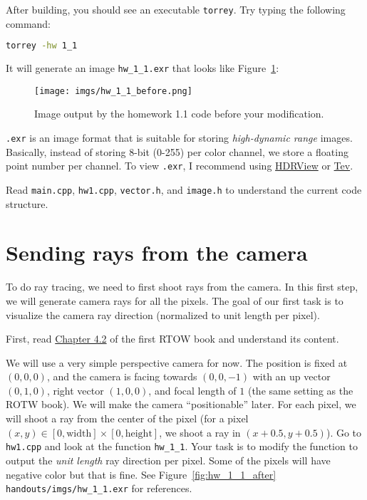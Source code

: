 After building, you should see an executable \lstinline{torrey}. Try typing the following command:
\begin{lstlisting}[language=bash]
  torrey -hw 1_1
\end{lstlisting}
It will generate an image \lstinline{hw_1_1.exr} that looks like Figure~\ref{fig:hw_1_1_before}:
\begin{figure}[ht]
    \centering
    \texttt{[image: imgs/hw\_1\_1\_before.png]}
    \caption{Image output by the homework 1.1 code before your modification.}
    \label{fig:hw_1_1_before}
\end{figure}

\lstinline{.exr} is an image format that is suitable for storing \emph{high-dynamic range} images. Basically, instead of storing 8-bit (0-255) per color channel, we store a floating point number per channel. To view \lstinline{.exr}, I recommend using \href{https://github.com/wkjarosz/hdrview}{HDRView} or \href{https://github.com/Tom94/tev}{Tev}.

Read \lstinline{main.cpp}, \lstinline{hw1.cpp}, \lstinline{vector.h}, and \lstinline{image.h} to understand the current code structure.

\section{Sending rays from the camera}
To do ray tracing, we need to first shoot rays from the camera. In this first step, we will generate camera rays for all the pixels. The goal of our first task is to visualize the camera ray direction (normalized to unit length per pixel).

First, read \href{https://raytracing.github.io/books/RayTracingInOneWeekend.html\#rays,asimplecamera,andbackground}{Chapter 4.2} of the first RTOW book and understand its content.

We will use a very simple perspective camera for now. The position is fixed at $(0, 0, 0)$, and the camera is facing towards $(0, 0, -1)$ with an up vector $(0, 1, 0)$, right vector $(1, 0, 0)$, and focal length of $1$ (the same setting as the ROTW book). We will make the camera ``positionable'' later. For each pixel, we will shoot a ray from the center of the pixel (for a pixel $(x, y) \in [0, \text{width}] \times [0, \text{height}]$, we shoot a ray in $(x + 0.5, y + 0.5)$). Go to \lstinline{hw1.cpp} and look at the function \lstinline{hw_1_1}. Your task is to modify the function to output the \emph{unit length} ray direction per pixel. Some of the pixels will have negative color but that is fine. See Figure~\ref{fig:hw_1_1_after} \lstinline{handouts/imgs/hw_1_1.exr} for references.

